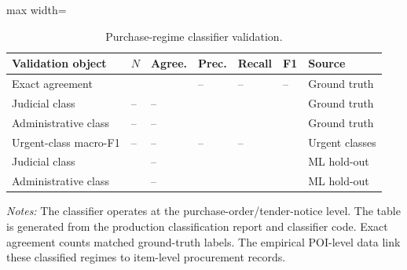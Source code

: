 \begin{table}[ht]
\centering
\caption{Purchase-regime classifier validation.}
\label{tab:classifier_validation_v9}
\begin{threeparttable}
\small
\setlength{\tabcolsep}{3pt}
\begin{adjustbox}{max width=\textwidth}
\begin{tabular}{p{.22\linewidth}p{.08\linewidth}p{.09\linewidth}p{.08\linewidth}p{.08\linewidth}p{.06\linewidth}p{.18\linewidth}}
\toprule
Validation object & $N$ & Agree. & Prec. & Recall & F1 & Source \\
\midrule
Exact agreement & \BPregexNGroundTruth{} & \BPregexExactMatchPct{} & -- & -- & -- & Ground truth \\
Judicial class & -- & -- & \BPregexPrecJud{} & \BPregexRecallJud{} & \BPregexFoneJud{} & Ground truth \\
Administrative class & -- & -- & \BPregexPrecAdm{} & \BPregexRecallAdm{} & \BPregexFoneAdm{} & Ground truth \\
Urgent-class macro-F1 & -- & -- & -- & -- & \BPregexFone{} & Urgent classes \\
Judicial class & \BPregexNHO{} & -- & \BPregexPrecJudHO{} & \BPregexRecallJudHO{} & \BPregexFoneJudHO{} & ML hold-out \\
Administrative class & \BPregexNHO{} & -- & \BPregexPrecAdmHO{} & \BPregexRecallAdmHO{} & \BPregexFoneAdmHO{} & ML hold-out \\
\bottomrule
\end{tabular}
\end{adjustbox}
\begin{tablenotes}[flushleft]\footnotesize
\item \textit{Notes:} The classifier operates at the purchase-order/tender-notice level. The table is generated from the production classification report and classifier code. Exact agreement counts \BPregexExactMatchN{} matched ground-truth labels. The empirical POI-level data link these classified regimes to item-level procurement records.
\end{tablenotes}
\end{threeparttable}
\end{table}
